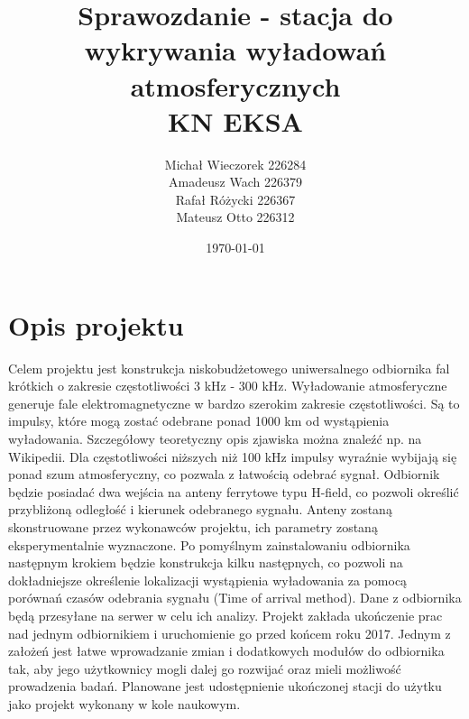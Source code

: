 \documentclass[12pt]{article}
\title{\textbf{Sprawozdanie - stacja do wykrywania wyładowań atmosferycznych}\\KN EKSA}
\author{Michał Wieczorek {226284}\\ Amadeusz Wach {226379}\\ Rafał Różycki {226367} \\ Mateusz Otto {226312}}
\date{\today}
\begin{document}
\maketitle
\newpage

\section{Opis projektu}
Celem projektu jest konstrukcja niskobudżetowego uniwersalnego odbiornika fal krótkich o zakresie częstotliwości 3 kHz - 300 kHz. Wyładowanie atmosferyczne generuje fale elektromagnetyczne w bardzo szerokim zakresie częstotliwości. Są to impulsy, które mogą zostać odebrane ponad 1000 km od wystąpienia wyładowania. Szczegółowy teoretyczny opis zjawiska można znaleźć np. na Wikipedii. Dla częstotliwości niższych niż 100 kHz impulsy wyraźnie wybijają się ponad szum atmosferyczny, co pozwala z łatwością odebrać sygnał. Odbiornik będzie posiadać dwa wejścia na anteny ferrytowe typu H-field, co pozwoli określić przybliżoną odległość i kierunek odebranego sygnału. Anteny zostaną skonstruowane przez wykonawców projektu, ich parametry zostaną eksperymentalnie wyznaczone. Po pomyślnym zainstalowaniu odbiornika następnym krokiem będzie konstrukcja kilku następnych, co pozwoli na dokładniejsze określenie lokalizacji wystąpienia wyładowania za pomocą porównań czasów odebrania sygnału (Time of arrival method). Dane z odbiornika będą przesyłane na serwer w celu ich analizy. Projekt zakłada ukończenie prac nad jednym odbiornikiem i uruchomienie go przed końcem roku 2017. Jednym z założeń jest łatwe wprowadzanie zmian i dodatkowych modułów do odbiornika tak, aby jego użytkownicy mogli dalej go rozwijać oraz mieli możliwość prowadzenia badań. Planowane jest udostępnienie ukończonej stacji do użytku jako projekt wykonany w kole naukowym.
\end{document}

